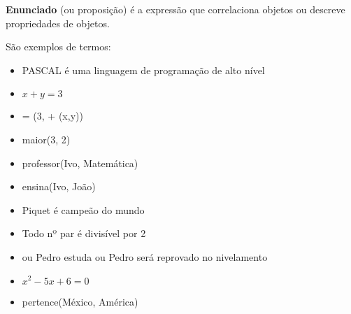 \documentclass[
	14pt,				%
	twoside,			%
	a4paper,			%
	english,			%
	french,				%
	spanish,			%
	brazil,				%
    ]{abntex2}
\begin{document}
\textbf{Enunciado} (ou proposição) é a expressão que correlaciona objetos ou descreve propriedades de objetos.

\noindent São exemplos de termos:

\begin{itemize}[itemsep=0.01pt]
\renewcommand\labelitemi{\textbf{-}}
    \item PASCAL é uma linguagem de programação de alto nível
    \item $x + y = 3$
    \item  = (3, + (x,y))
    \item  maior(3, 2)
    \item professor(Ivo, Matemática)
    \item ensina(Ivo, João)
    \item Piquet é campeão do mundo
    \item Todo nº par é divisível por 2
    \item ou Pedro estuda ou Pedro será reprovado no nivelamento
    \item $x^2 - 5x + 6 = 0$
    \item pertence(México, América)
\end{itemize}

\newpage
\end{document}
